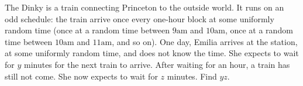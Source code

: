 The Dinky is a train connecting Princeton to the outside world. It runs on an odd schedule: the train arrive once every one-hour block at some uniformly random time (once at a random time between $\text{9am}$ and $\text{10am}$, once at a random time between $\text{10am}$ and $\text{11am}$, and so on). One day, Emilia arrives at the station, at some uniformly random time, and does not know the time. She expects to wait for $y$ minutes for the next train to arrive. After waiting for an hour, a train has still not come. She now expects to wait for $z$ minutes. Find $yz$.